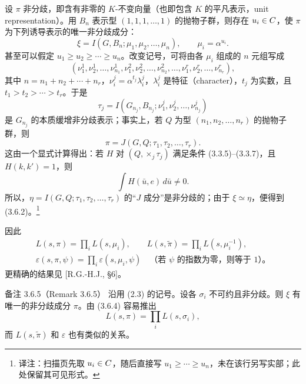 设 $\pi$ 非分歧，即含有非零的 $K$-不变向量（也即包含 $K$ 的平凡表示，unit representation）。用 $B_n$ 表示型 $(1,1,1,\ldots,1)$ 的抛物子群，则存在 $u_i\in C$，使 $\pi$ 为下列诱导表示的唯一非分歧成分：
\begin{equation}
\xi=I(G,B_n;\mu_1,\mu_2,\ldots,\mu_n),\qquad \mu_i=\alpha^{u_i}.\tag{3.6.1}
\end{equation}
甚至可以假定 $u_1\geq u_2\geq\cdots\geq u_n$。改变记号，可将由各 $\mu_i$ 组成的 $n$ 元组写成
\[
(\nu_1^1,\nu_2^1,\ldots,\nu_{n_1}^1,
 \nu_1^2,\nu_2^2,\ldots,\nu_{n_2}^2,\ldots,
 \nu_1^r,\nu_2^r,\ldots,\nu_{n_r}^r),
\]
其中 $n=n_1+n_2+\cdots+n_r$，$\nu_i^j=\alpha^{t_j}\lambda_i^j$，$\lambda_i^j$ 是特征（character），$t_j$ 为实数，且 $t_1>t_2>\cdots>t_r$。于是
\[
\tau_j=I(G_{n_j},B_{n_j};\nu_1^j,\nu_2^j,\ldots,\nu_{n_j}^j)
\]
是 $G_{n_j}$ 的本质缓增非分歧表示；事实上，若 $Q$ 为型 $(n_1,n_2,\ldots,n_r)$ 的抛物子群，则
\begin{equation}
\pi=J(G,Q;\tau_1,\tau_2,\ldots,\tau_r).\tag{3.6.2}
\end{equation}
这由一个显式计算得出：若 $H$ 对 $(Q,\mathop{\times}_j\tau_j)$ 满足条件 (3.3.5)--(3.3.7)，且 $H(k,k')=1$，则
\begin{equation}
\int H(\bar u,e)\,d\bar u\ne0.\tag{3.6.3}
\end{equation}
所以，$\eta=I(G,Q;\tau_1,\tau_2,\ldots,\tau_r)$ 的“$J$ 成分”是非分歧的；由于 $\xi\simeq\eta$，便得到 (3.6.2)。\footnote{译注：扫描页先取 $u_i\in C$，随后直接写 $u_1\geq\cdots\geq u_n$，未在该行另写实部；此处保留其可见形式。}

因此
\begin{equation}
\begin{gathered}
L(s,\pi)=\prod_iL(s,\mu_i),\qquad
L(s,\widetilde\pi)=\prod_iL(s,\mu_i^{-1}),\\
\varepsilon(s,\pi,\psi)=\prod_i\varepsilon(s,\mu_i,\psi)
\quad\text{（若 $\psi$ 的指数为零，则等于 $1$）。}
\end{gathered}\tag{3.6.4}
\end{equation}
更精确的结果见 [R.G.-H.J., \S6]。

\begin{originaltheorem}{备注 3.6.5（Remark 3.6.5）}
沿用 (2.3) 的记号。设各 $\sigma_i$ 不可约且非分歧。则 $\xi$ 有唯一的非分歧成分 $\pi$。由 (3.6.4) 容易推出
\[
L(s,\pi)=\prod_iL(s,\sigma_i),
\]
而 $L(s,\widetilde\pi)$ 和 $\varepsilon$ 也有类似的关系。
\end{originaltheorem}


